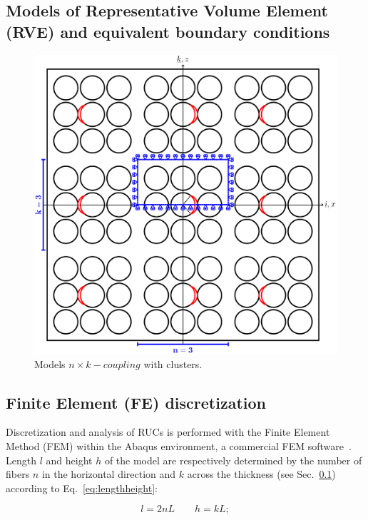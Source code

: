 \documentclass[review]{elsarticle}
\begin{document}
\subsection{Models of Representative Volume Element (RVE) and equivalent boundary conditions}\label{subsec:rve}



\begin{figure}[!h]
\centering
\includegraphics[width=\textwidth]{rveCoupling.pdf}
\caption{Models $n\times k-coupling$ with clusters.}\label{fig:laminateModelsA}
\end{figure}



\subsection{Finite Element (FE) discretization}

Discretization and analysis of RUCs is performed with the Finite Element Method (FEM) within the Abaqus environment, a commercial FEM software~\cite{abq12}. Length $l$ and height $h$ of the model are respectively determined by the number of fibers $n$ in the horizontal direction and $k$ across the thickness (see Sec.~\ref{subsec:rve}) according to Eq.~\ref{eq:lengthheight}:

\begin{equation}\label{eq:lengthheight}
l=2nL\qquad h=kL;
\end{equation}
\end{document}
